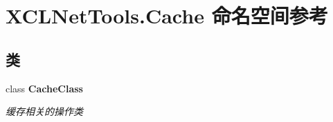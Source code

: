 \hypertarget{namespace_x_c_l_net_tools_1_1_cache}{}\section{X\+C\+L\+Net\+Tools.\+Cache 命名空间参考}
\label{namespace_x_c_l_net_tools_1_1_cache}
\subsection*{类}
\begin{DoxyCompactItemize}
\item 
class {\bfseries Cache\+Class}
\begin{DoxyCompactList}\small\item\em 缓存相关的操作类 \end{DoxyCompactList}\end{DoxyCompactItemize}
